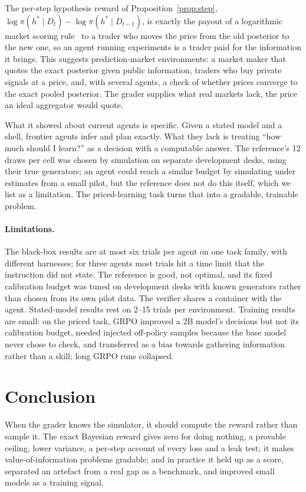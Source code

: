 \documentclass[10pt]{article}
\theoremstyle{definition}
\theoremstyle{remark}
\theoremstyle{plain}
\begin{document}
The per-step hypothesis reward of Proposition~\ref{prop:step},
$\log\pi(h^{*}\mid D_t)-\log\pi(h^{*}\mid D_{t-1})$, is exactly the payout of a logarithmic market
scoring rule~\citep{hanson2003combinatorial} to a trader who moves the price from the old
posterior to the new one, so an agent running experiments is a trader paid for the information
it brings. This suggests prediction-market environments: a market maker that quotes the exact
posterior given public information, traders who buy private signals at a price, and, with
several agents, a check of whether prices converge to the exact pooled posterior. The grader
supplies what real markets lack, the price an ideal aggregator would quote.

What it showed about current agents is specific. Given a stated model and a shell, frontier
agents infer and plan exactly. What they lack is treating ``how much should I learn?'' as a
decision with a computable answer. The reference's 12 draws per cell was chosen by simulation on
separate development desks, using their true generators; an agent could reach a similar budget
by simulating under estimates from a small pilot, but the reference does not do this itself, which
we list as a limitation. The priced-learning task turns that into a gradable, trainable problem.

\paragraph{Limitations.} The black-box results are at most six trials per agent on one task
family, with different harnesses; for three agents most trials hit a time limit that the
instruction did not state. The reference is good, not optimal, and its fixed calibration budget was tuned on development desks with known generators rather than chosen from its own pilot data. The verifier shares a container
with the agent. Stated-model results rest on 2--15 trials per environment. Training results are
small: on the priced task, GRPO improved a 2B model's decisions but not its calibration budget,
needed injected off-policy samples because the base model never chose to check, and transferred
as a bias towards gathering information rather than a skill; long GRPO runs collapsed.

\section{Conclusion}

When the grader knows the simulator, it should compute the reward rather than sample it. The
exact Bayesian reward gives zero for doing nothing, a provable ceiling, lower variance, a per-step
account of every loss and a leak test; it makes value-of-information problems gradable; and in
practice it held up as a score, separated an artefact from a real gap as a benchmark, and improved
small models as a training signal.
\end{document}
